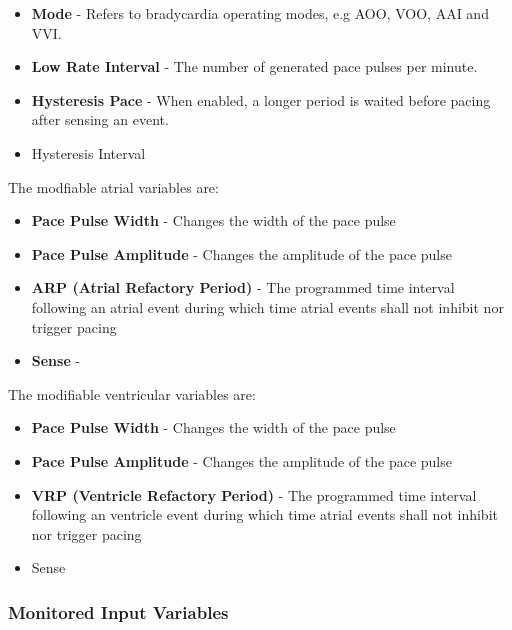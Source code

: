 \documentclass{article}
\begin{document}
\begin{itemize}
    \item \textbf{Mode} - Refers to bradycardia operating modes, e.g AOO, VOO, AAI and VVI.
    \item \textbf{Low Rate Interval} - The number of generated pace pulses per minute.
    \item \textbf{Hysteresis Pace} - When enabled, a longer period is waited before pacing after sensing an event.
    \item Hysteresis Interval 
\end{itemize}
The modfiable atrial variables are:

\begin{itemize}
    \item \textbf{Pace Pulse Width} - Changes the width of the pace pulse
    \item \textbf{Pace Pulse Amplitude} - Changes the amplitude of the pace pulse
    \item \textbf{ARP (Atrial Refactory Period)} - The programmed time interval following an atrial event during which time atrial
            events shall not inhibit nor trigger pacing
    \item \textbf{Sense} - 
\end{itemize}
The modifiable ventricular variables are:

\begin{itemize}
    \item \textbf{Pace Pulse Width} - Changes the width of the pace pulse
    \item \textbf{Pace Pulse Amplitude} - Changes the amplitude of the pace pulse
    \item \textbf{VRP (Ventricle Refactory Period)} - The programmed time interval following an ventricle event during which time atrial
            events shall not inhibit nor trigger pacing
    \item Sense
\end{itemize}

\newpage
\subsubsection{Monitored Input Variables}
\end{document}
